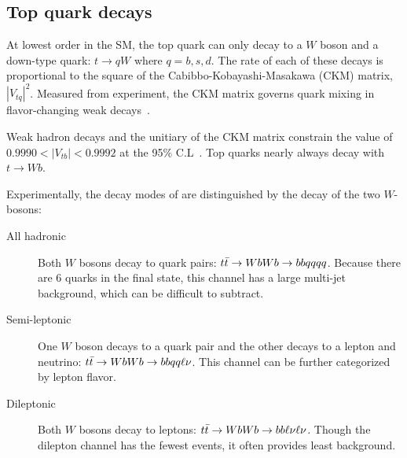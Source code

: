 \subsection{Top quark decays}
At lowest order in the SM, the top quark can only decay to a $W$ boson and a down-type quark: $t \rightarrow qW$ where $q=b,s,d$. The rate of each of these decays is proportional to the square of the Cabibbo-Kobayashi-Masakawa (CKM) matrix, $|V_{tq}|^2$. Measured from experiment, the CKM matrix governs quark mixing in flavor-changing weak decays~\cite{PDG}.

Weak hadron decays and the unitiary of the CKM matrix constrain the value of $0.9990 < |V_{tb}| < 0.9992$ at the 95\% C.L~\cite{Chetyrkin:1999ys}. Top quarks nearly always decay with $t \rightarrow Wb$.

Experimentally, the decay modes of \ttbar are distinguished by the decay of the two $W$-bosons:
\begin{description}
\item[All hadronic] Both $W$ bosons decay to quark pairs: $t\bar{t} \rightarrow WbWb \rightarrow bbqqqq$. Because there are 6 quarks in the final state, this channel has a large multi-jet background, which can be difficult to subtract. 

\item[Semi-leptonic] One $W$ boson decays to a quark pair and the other decays to a lepton and neutrino: $t\bar{t} \rightarrow WbWb \rightarrow bbqq \ell \nu$. This channel can be further categorized by lepton flavor.


\item[Dileptonic] Both $W$ bosons decay to leptons: $t\bar{t} \rightarrow WbWb \rightarrow bb\ell \nu\ell \nu$. Though the dilepton channel has the fewest events, it often provides least background.


\end{description} 



